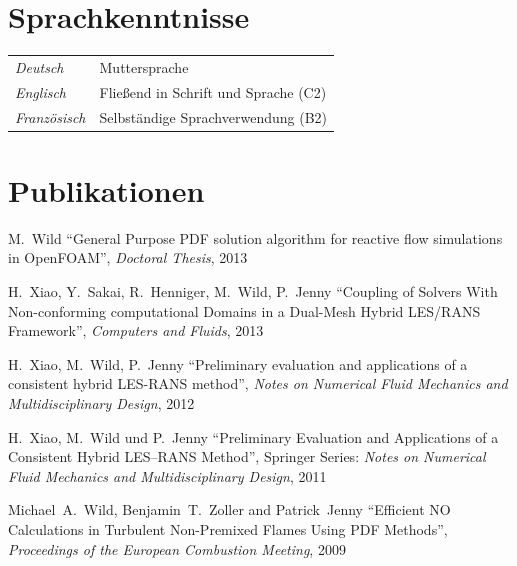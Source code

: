 \documentclass[line,11pt,a4paper]{../resume}
\begin{document}
\begin{resume}
\section{\mysidestyle Sprachkenntnisse}\vspace{2mm}
\begin{tabular}{@{}ll}
  \textsl{Deutsch}     & Muttersprache \\
  \textsl{Englisch}    & Flie{\ss}end in Schrift und Sprache (C2) \\
  \textsl{Französisch} & Selbständige Sprachverwendung (B2) \\
\end{tabular}

\section{\mysidestyle Publikationen}\vspace{2mm}
M.~Wild
``General Purpose PDF solution algorithm for reactive flow simulations in
OpenFOAM'', \textsl{Doctoral Thesis}, 2013

\vspace{-3mm}
H.~Xiao, Y.~Sakai, R.~Henniger, M.~Wild, P.~Jenny
``Coupling of Solvers With Non-conforming computational Domains in a Dual-Mesh
Hybrid LES/RANS Framework'', \textsl{Computers and Fluids}, 2013

\vspace{-3mm}
H.~Xiao, M.~Wild, P.~Jenny
``Preliminary evaluation and applications of a consistent hybrid LES-RANS
method'', \textsl{Notes on Numerical Fluid Mechanics and Multidisciplinary
Design}, 2012

\vspace{-3mm}
H.~Xiao, M.~Wild und P.~Jenny ``Preliminary Evaluation and
Applications of a Consistent Hybrid LES--RANS Method'', Springer Series:
\textsl{Notes on Numerical Fluid Mechanics and Multidisciplinary Design}, 2011

\vspace{-3mm}
Michael~A.~Wild, Benjamin~T.~Zoller and Patrick~Jenny
``Efficient NO Calculations in Turbulent Non-Premixed Flames Using
PDF Methods'', \textsl{Proceedings of the European Combustion Meeting}, 2009



\end{resume}
\end{document}
